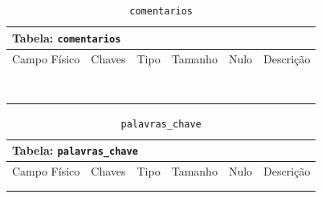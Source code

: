 \documentclass[12pt,a4paper]{article}
\begin{document}
\begin{center}
\begin{table}[h!]
	\caption{\texttt{comentarios}}
	\label{tabela:comentarios}
	\begin{tabular}{|p{2.3cm}|p{1.2cm}|p{1.8cm}|p{1.5cm}|p{1cm}|p{6cm}|}\hline	
		\multicolumn{6}{|p{16cm}|}{\cellcolor{cinzaClaro}  \centering Tabela: \texttt{comentarios}} \\ \hline %
		{\small Campo Físico}   & {\small Chaves} & {\small Tipo} & {\small Tamanho} & {\small Nulo} & {\small Descrição}\\\hline %
		
		{\tiny } & {\tiny } & {\tiny } & {\tiny } & {\tiny } &{\tiny }\\\hline
		{\tiny } & {\tiny } & {\tiny } & {\tiny } & {\tiny } &{\tiny }\\\hline
		{\tiny } & {\tiny } & {\tiny } & {\tiny } & {\tiny } &{\tiny }\\\hline
		{\tiny } & {\tiny } & {\tiny } & {\tiny } & {\tiny } &{\tiny }\\\hline
		{\tiny } & {\tiny } & {\tiny } & {\tiny } & {\tiny } &{\tiny }\\\hline
		{\tiny } & {\tiny } & {\tiny } & {\tiny } & {\tiny } &{\tiny }\\\hline
		{\tiny } & {\tiny } & {\tiny } & {\tiny } & {\tiny } &{\tiny }\\\hline
		{\tiny } & {\tiny } & {\tiny } & {\tiny } & {\tiny } &{\tiny }\\\hline
		
			
	\end{tabular}
\end{table}	
\end{center}

\begin{center}
\begin{table}[h!]
	\caption{\texttt{palavras\_chave}}
	\label{tabela:palavrasChave}
	\begin{tabular}{|p{2.3cm}|p{1.2cm}|p{1.8cm}|p{1.5cm}|p{1cm}|p{6cm}|}\hline		
		\multicolumn{6}{|p{16cm}|}{\cellcolor{cinzaClaro}  \centering Tabela: \texttt{palavras\_chave}} \\ \hline %
		{\small Campo Físico}   & {\small Chaves} & {\small Tipo} & {\small Tamanho} & {\small Nulo} & {\small Descrição}\\\hline %
		
		{\tiny } & {\tiny } & {\tiny } & {\tiny } & {\tiny } &{\tiny }\\\hline
		{\tiny } & {\tiny } & {\tiny } & {\tiny } & {\tiny } &{\tiny }\\\hline
			
	\end{tabular}
\end{table}	
\end{center}
\end{document}
